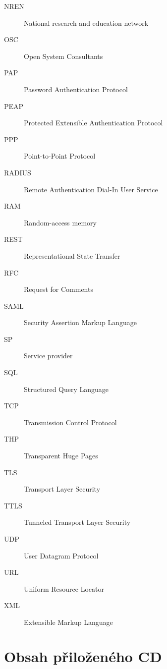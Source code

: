 \documentclass[thesis=M,czech]{FITthesis}[2012/06/26]
\begin{document}
\begin{description}
    \item[NREN] National research and education network
    \item[OSC] Open System Consultants
    \item[PAP] Password Authentication Protocol
    \item[PEAP] Protected Extensible Authentication Protocol
    \item[PPP] Point-to-Point Protocol
    \item[RADIUS] Remote Authentication Dial-In User Service
    \item[RAM] Random-access memory
    \item[REST] Representational State Transfer
    \item[RFC] Request for Comments
    \item[SAML] Security Assertion Markup Language
    \item[SP] Service provider
    \item[SQL] Structured Query Language
    \item[TCP] Transmission Control Protocol
    \item[THP] Transparent Huge Pages
    \item[TLS] Transport Layer Security
    \item[TTLS] Tunneled Transport Layer Security
    \item[UDP] User Datagram Protocol
    \item[URL] Uniform Resource Locator
    \item[XML] Extensible Markup Language

\end{description}


\chapter{Obsah přiloženého CD}

\begin{figure}
\end{figure}
\end{document}
